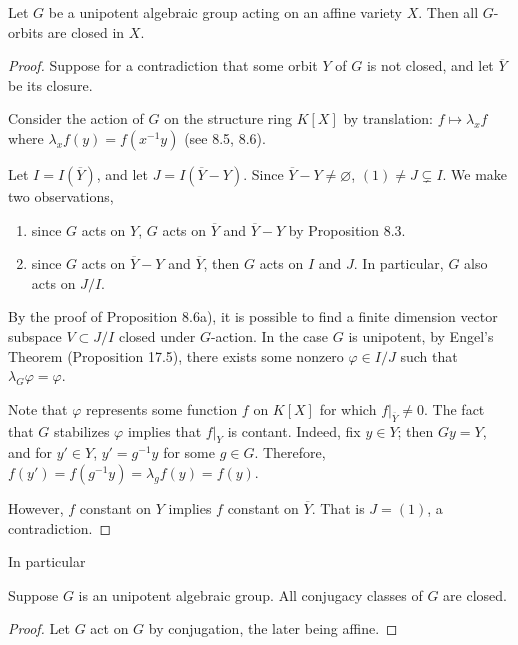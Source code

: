 \begin{prop}[Ex. 17.8]\label{ex_17_8}
Let $G$ be a unipotent algebraic group acting on an affine variety 
$X$. Then all $G$-orbits are closed in $X$.
\end{prop}

\begin{proof}
Suppose for a contradiction that some orbit $Y$ of $G$ is not
closed, and let $\overline{Y}$ be its closure.

Consider the action of $G$ on the structure ring $K[X]$ by 
translation: $f \mapsto \lambda_x f$ where $\lambda_x f(y) = 
f(x^{-1}y)$ (see 8.5, 8.6). 

Let $I = I(\overline{Y})$, and let $J = I(\overline{Y} - Y)$.
Since $\overline{Y} - Y \neq \varnothing$, $(1) \neq J \subsetneq 
I$. We make two observations,

\begin{enumerate}
\item since $G$ acts on $Y$, $G$ acts on $\overline{Y}$ and 
$\overline{Y} - Y$ by Proposition 8.3.

\item since $G$ acts on $\overline{Y} - Y$ and $\overline{Y}$, 
then $G$ acts on $I$ and $J$. In particular, $G$ also acts on
$J/I$.
\end{enumerate}

By the proof of Proposition 8.6a), it is possible to find a
finite dimension vector subspace $V \subset J/I$ closed under 
$G$-action. In the case $G$ is unipotent, by Engel's Theorem
(Proposition 17.5), there exists some nonzero $\varphi \in I/J$ 
such that $\lambda_G \varphi = \varphi$.

Note that $\varphi$ represents some function $f$ on $K[X]$ for
which $f|_{\overline{Y}} \neq 0$. The fact that $G$ stabilizes 
$\varphi$ implies that $f|_Y$ is contant. Indeed, fix $y \in Y$;
then $Gy = Y$, and for $y' \in Y$, $y' = g^{-1}y$ for some $g \in G$.
Therefore, $f(y') = f(g^{-1}y) = \lambda_{g}f(y) = f(y)$.

However, $f$ constant on $Y$ implies $f$ constant on $\overline{Y}$.
That is $J = (1)$, a contradiction.
\end{proof}

In particular

\begin{cor}
Suppose $G$ is an unipotent algebraic group. All conjugacy 
classes of $G$ are closed.
\end{cor}
\begin{proof}
Let $G$ act on $G$ by conjugation, the later being affine.
\end{proof}

